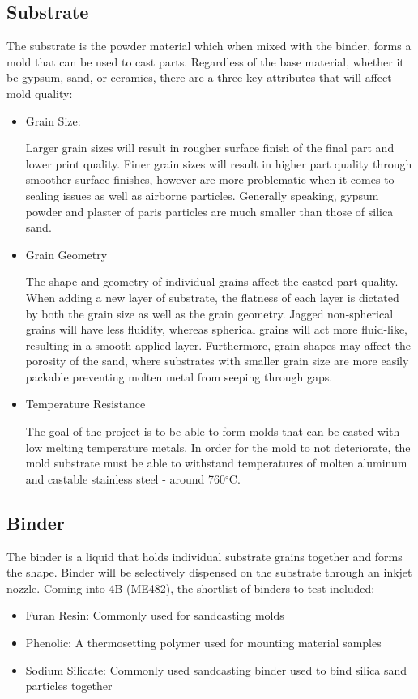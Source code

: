 \documentclass[11pt]{article}
\begin{document}
\subsection{Substrate}
The substrate is the powder material which when mixed with the binder, forms a mold that can be used to cast parts. Regardless of the base material, whether it be gypsum, sand, or ceramics, there are a three key attributes that will affect mold quality:
\begin{itemize}
	\item Grain Size: 
		\begin{addmargin}[1em]{1em}
		Larger grain sizes will result in rougher surface finish of the final part and lower print quality. Finer grain sizes will result in higher part quality through smoother surface finishes, however are more problematic when it comes to sealing issues as well as airborne particles. Generally speaking, gypsum powder and plaster of paris particles are much smaller than those of silica sand. 
		\end{addmargin}
	\item Grain Geometry
		\begin{addmargin}[1em]{1em}
		The shape and geometry of individual grains affect the casted part quality. When adding a new layer of substrate, the flatness of each layer is dictated by both the grain size as well as the grain geometry. Jagged non-spherical grains will have less fluidity, whereas spherical grains will act more fluid-like, resulting in a smooth applied layer. Furthermore, grain shapes may affect the porosity of the sand, where substrates with smaller grain size are more easily packable preventing molten metal from seeping through gaps.
		\end{addmargin}
	\item Temperature Resistance
		\begin{addmargin}[1em]{1em}
		The goal of the project is to be able to form molds that can be casted with low melting temperature metals. In order for the mold to not deteriorate, the mold substrate must be able to withstand temperatures of molten aluminum and castable stainless steel - around 760$^{\circ}$C.
		\end{addmargin}
\end{itemize}

\subsection{Binder}
The binder is a liquid that holds individual substrate grains together and forms the shape. Binder will be selectively dispensed on the substrate through an inkjet nozzle. Coming into 4B (ME482), the shortlist of binders to test included:
\begin{itemize}
	\item Furan Resin: Commonly used for sandcasting molds
	\item Phenolic: A thermosetting polymer used for mounting material samples
	\item Sodium Silicate: Commonly used sandcasting binder used to bind silica sand particles together
\end{itemize}
\end{document}
